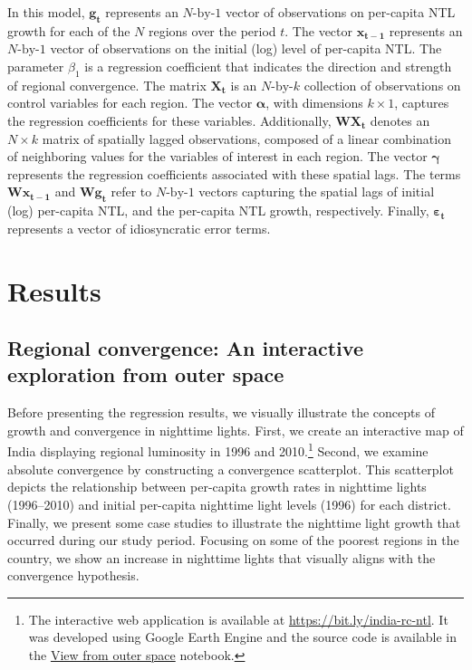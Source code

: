\documentclass[
  letterpaper,
  DIV=11,
  numbers=noendperiod]{scrartcl}
\begin{document}
In this model, \(\boldsymbol{g_t}\) represents an \(N\text{-by-}1\)
vector of observations on per-capita NTL growth for each of the \(N\)
regions over the period \(t\). The vector \(\boldsymbol{x_{t-1}}\)
represents an \(N\text{-by-}1\) vector of observations on the initial
(log) level of per-capita NTL. The parameter \(\beta_1\) is a regression
coefficient that indicates the direction and strength of regional
convergence. The matrix \(\boldsymbol{X_t}\) is an \(N\text{-by-}k\)
collection of observations on control variables for each region. The
vector \(\boldsymbol{\alpha}\), with dimensions \(k \times 1\), captures
the regression coefficients for these variables. Additionally,
\(\boldsymbol{W}\boldsymbol{X_t}\) denotes an \(N \times k\) matrix of
spatially lagged observations, composed of a linear combination of
neighboring values for the variables of interest in each region. The
vector \(\boldsymbol{\gamma}\) represents the regression coefficients
associated with these spatial lags. The terms
\(\boldsymbol{W} \boldsymbol{x_{t-1}}\) and
\(\boldsymbol{W} \boldsymbol{g_t}\) refer to \(N\text{-by-}1\) vectors
capturing the spatial lags of initial (log) per-capita NTL, and the
per-capita NTL growth, respectively. Finally,
\(\boldsymbol{\varepsilon_t}\) represents a vector of idiosyncratic
error terms.

\section{Results}\label{results}

\subsection{Regional convergence: An interactive exploration from outer
space}\label{regional-convergence-an-interactive-exploration-from-outer-space}

Before presenting the regression results, we visually illustrate the
concepts of growth and convergence in nighttime lights. First, we create
an interactive map of India displaying regional luminosity in 1996 and
2010.\footnote{The interactive web application is available at
  \url{https://bit.ly/india-rc-ntl}. It was developed using Google Earth
  Engine and the source code is available in the
  \href{https://quarcs-lab.github.io/project2025s/notebooks/c01_view_from_space.html}{View
  from outer space} notebook.} Second, we examine absolute convergence
by constructing a convergence scatterplot. This scatterplot depicts the
relationship between per-capita growth rates in nighttime lights
(1996--2010) and initial per-capita nighttime light levels (1996) for
each district. Finally, we present some case studies to illustrate the
nighttime light growth that occurred during our study period. Focusing
on some of the poorest regions in the country, we show an increase in
nighttime lights that visually aligns with the convergence hypothesis.
\end{document}

